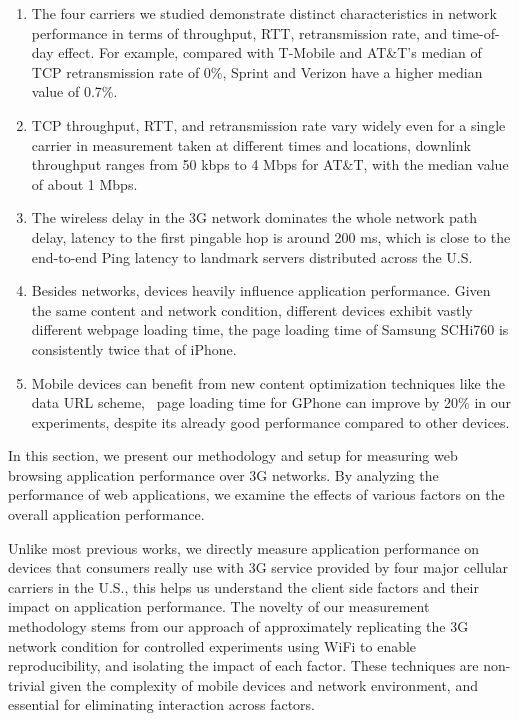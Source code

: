 \begin{enumerate}

\item The four carriers we studied demonstrate distinct 
characteristics in network performance in terms of throughput, RTT, 
retransmission rate, and time-of-day effect. For example, compared 
with T-Mobile and AT\&T's median of TCP retransmission rate of 
0\%, Sprint and Verizon have a higher median value of 0.7\%. 

\item TCP throughput, RTT, and retransmission rate vary widely even
for a single carrier in measurement taken at different times and 
locations, \eg downlink throughput ranges from 50 kbps to 4 Mbps for 
AT\&T, with the median value of about 1 Mbps.

\item The wireless delay in the 3G network dominates the whole
network path delay, \eg latency to the first pingable hop is around 
200 ms, which is close to the end-to-end Ping latency to landmark
servers distributed across the U.S.

\item Besides networks, devices heavily influence application 
performance. Given the same content and network condition, different 
devices exhibit vastly different webpage loading time, \eg the
page loading time of Samsung SCHi760 is consistently twice that of 
iPhone. 

\item Mobile devices can benefit from new content optimization
techniques like the data URL scheme, \eg~page loading time for 
GPhone can improve by 20\% in our experiments, despite 
its already good performance compared to other devices.
\end{enumerate}

\label{sec:app.method}

In this section, we present our methodology and setup for measuring web browsing application performance over 3G networks. By analyzing the performance of web applications, we examine the effects of various factors on the overall application performance.

Unlike most previous works, we directly measure application 
performance on devices that consumers really use with 3G service 
provided by four major cellular carriers in the U.S., this helps us 
understand the client side factors and their impact on application 
performance. The novelty of our measurement methodology stems from 
our approach of approximately replicating the 3G network condition 
for controlled experiments using WiFi to enable reproducibility, 
and isolating the impact of each factor. These techniques are 
non-trivial given the complexity of mobile devices and network 
environment, and essential for eliminating interaction across factors. 

